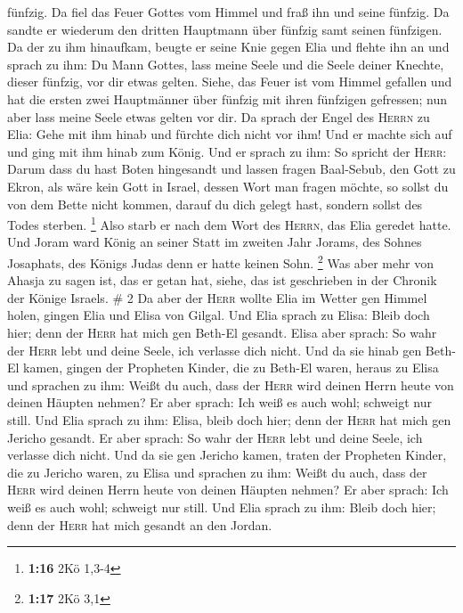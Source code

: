 fünfzig. Da fiel das Feuer Gottes vom Himmel und fraß ihn und seine
fünfzig.  Da sandte er wiederum den dritten Hauptmann
über fünfzig samt seinen fünfzigen. Da der zu ihm hinaufkam, beugte er
seine Knie gegen Elia und flehte ihn an und sprach zu ihm: Du Mann
Gottes, lass meine Seele und die Seele deiner Knechte, dieser fünfzig,
vor dir etwas gelten.  Siehe, das Feuer ist vom Himmel
gefallen und hat die ersten zwei Hauptmänner über fünfzig mit ihren
fünfzigen gefressen; nun aber lass meine Seele etwas gelten vor dir.
 Da sprach der Engel des \textsc{Herrn} zu Elia: Gehe mit
ihm hinab und fürchte dich nicht vor ihm! Und er machte sich auf und
ging mit ihm hinab zum König.  Und er sprach zu ihm: So
spricht der \textsc{Herr}: Darum dass du hast Boten hingesandt und
lassen fragen Baal-Sebub, den Gott zu Ekron, als wäre kein Gott in
Israel, dessen Wort man fragen möchte, so sollst du von dem Bette nicht
kommen, darauf du dich gelegt hast, sondern sollst des Todes sterben.
\footnote{\textbf{1:16} 2Kö 1,3-4}  Also starb er nach
dem Wort des \textsc{Herrn}, das Elia geredet hatte. Und Joram ward
König an seiner Statt im zweiten Jahr Jorams, des Sohnes Josaphats, des
Königs Judas denn er hatte keinen Sohn. \footnote{\textbf{1:17} 2Kö 3,1}
 Was aber mehr von Ahasja zu sagen ist, das er getan hat,
siehe, das ist geschrieben in der Chronik der Könige Israels. \# 2
 Da aber der \textsc{Herr} wollte Elia im Wetter gen
Himmel holen, gingen Elia und Elisa von Gilgal.  Und Elia
sprach zu Elisa: Bleib doch hier; denn der \textsc{Herr} hat mich gen
Beth-El gesandt. Elisa aber sprach: So wahr der \textsc{Herr} lebt und
deine Seele, ich verlasse dich nicht. Und da sie hinab gen Beth-El
kamen,  gingen der Propheten Kinder, die zu Beth-El waren,
heraus zu Elisa und sprachen zu ihm: Weißt du auch, dass der
\textsc{Herr} wird deinen Herrn heute von deinen Häupten nehmen? Er aber
sprach: Ich weiß es auch wohl; schweigt nur still.  Und
Elia sprach zu ihm: Elisa, bleib doch hier; denn der \textsc{Herr} hat
mich gen Jericho gesandt. Er aber sprach: So wahr der \textsc{Herr} lebt
und deine Seele, ich verlasse dich nicht. Und da sie gen Jericho kamen,
 traten der Propheten Kinder, die zu Jericho waren, zu
Elisa und sprachen zu ihm: Weißt du auch, dass der \textsc{Herr} wird
deinen Herrn heute von deinen Häupten nehmen? Er aber sprach: Ich weiß
es auch wohl; schweigt nur still.  Und Elia sprach zu ihm:
Bleib doch hier; denn der \textsc{Herr} hat mich gesandt an den Jordan.
